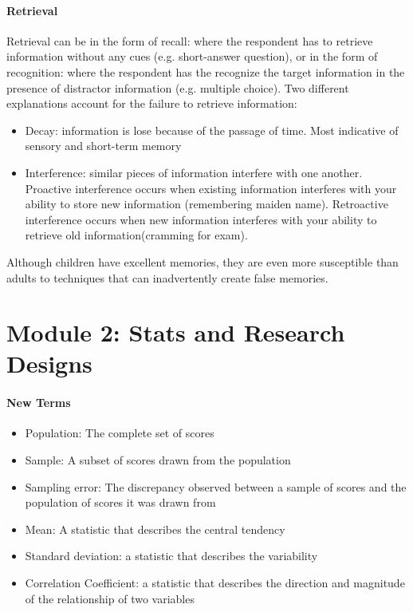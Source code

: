 \documentclass[10pt,letter]{article}
\theoremstyle{plain}
\theoremstyle{definition}
\begin{document}
\paragraph{Retrieval}
Retrieval can be in the form of recall: where the respondent has to retrieve information without any cues (e.g. short-answer question), or in the form of recognition: where the respondent has the recognize the target information in the presence of distractor information (e.g. multiple choice). Two different explanations account for the failure to retrieve information: 
\begin{itemize}
    \item Decay: information is lose because of the passage of time. Most indicative of sensory and short-term memory
    \item Interference: similar pieces of information interfere with one another. Proactive interference occurs when existing information interferes with your ability to store new information (remembering maiden name). Retroactive interference occurs when new information interferes with your ability to retrieve old information(cramming for exam). 
\end{itemize}
Although children have excellent memories, they are even more susceptible than adults to techniques that can inadvertently create false memories. 

\section*{Module 2: Stats and Research Designs}
\paragraph{New Terms}
\begin{itemize}
    \item Population: The complete set of scores 
    \item Sample: A subset of scores drawn from the population 
    \item Sampling error: The discrepancy observed between a sample of scores and the population of scores it was drawn from 
    \item Mean: A statistic that describes the central tendency 
    \item Standard deviation: a statistic that describes the variability
    \item Correlation Coefficient: a statistic that describes the direction and magnitude of the relationship of two variables 
\end{itemize}
\end{document}
